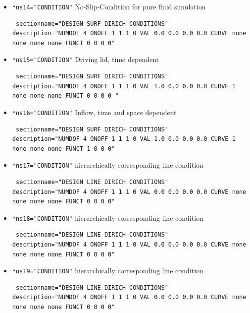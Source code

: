 \begin{itemize}
 \item \verb|*ns14="CONDITION"| \qquad No-Slip-Condition for pure fluid simulation
\begin{small} \begin{verbatim} sectionname="DESIGN SURF DIRICH CONDITIONS"
description="NUMDOF 4 ONOFF 1 1 1 0 VAL 0.0 0.0 0.0 0.0 CURVE none none none none FUNCT 0 0 0 0"
\end{verbatim} \end{small}

 \item \verb|*ns15="CONDITION"| \qquad Driving lid, time dependent
\begin{small} \begin{verbatim} sectionname="DESIGN SURF DIRICH CONDITIONS"
description="NUMDOF 4 ONOFF 1 1 1 0 VAL 1.0 0.0 0.0 0.0 CURVE 1 none none none FUNCT 0 0 0 0 "
\end{verbatim} \end{small}

 \item \verb|*ns16="CONDITION"| \qquad Inflow, time and space dependent
\begin{small} \begin{verbatim} sectionname="DESIGN SURF DIRICH CONDITIONS"
description="NUMDOF 4 ONOFF 1 1 1 0 VAL 1.0 0.0 0.0 0.0 CURVE 1 none none none FUNCT 1 0 0 0"
\end{verbatim} \end{small}

 \item \verb|*ns17="CONDITION"| \qquad hierarchically corresponding line condition
\begin{small} \begin{verbatim} sectionname="DESIGN LINE DIRICH CONDITIONS"
description="NUMDOF 4 ONOFF 1 1 1 0 VAL 0.0 0.0 0.0 0.0 CURVE none none none none FUNCT 0 0 0 0"
\end{verbatim} \end{small}

 \item \verb|*ns18="CONDITION"| \qquad hierarchically corresponding line condition
\begin{small} \begin{verbatim} sectionname="DESIGN LINE DIRICH CONDITIONS"
description="NUMDOF 4 ONOFF 1 1 1 0 VAL 0.0 0.0 0.0 0.0 CURVE none none none none FUNCT 0 0 0 0"
\end{verbatim} \end{small}

 \item \verb|*ns19="CONDITION"| \qquad hierarchically corresponding line condition
\begin{small} \begin{verbatim} sectionname="DESIGN LINE DIRICH CONDITIONS"
description="NUMDOF 4 ONOFF 1 1 1 0 VAL 0.0 0.0 0.0 0.0 CURVE none none none none FUNCT 0 0 0 0"
\end{verbatim} \end{small}


\end{itemize}
